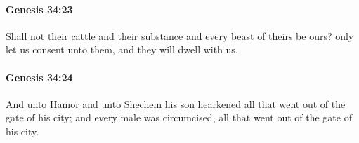 		\paragraph{Genesis 34:23} %
			\label{GENESIS-34-23}

			Shall not their cattle and their substance and every beast of theirs be ours? only let us consent unto them, and they will dwell with us.


		\paragraph{Genesis 34:24} %
			\label{GENESIS-34-24}

			And unto Hamor and unto Shechem his son hearkened all that went out of the gate of his city; and every male was circumcised, all that went out of the gate of his city.


